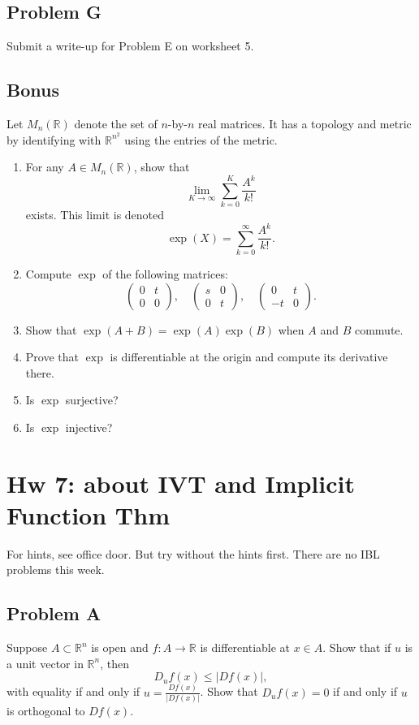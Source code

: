 \documentclass[lang=cn,11pt]{template}
\begin{document}
\section*{Problem G}
Submit a write-up for Problem E on worksheet 5.

\section*{Bonus}
Let $M_n(\mathbb{R})$ denote the set of $n$-by-$n$ real matrices. It has a topology and metric by identifying with $\mathbb{R}^{n^2}$ using the entries of the metric.
\begin{enumerate}
    \item For any $A \in M_n(\mathbb{R})$, show that
    \[
    \lim_{K \to \infty} \sum_{k=0}^K \frac{A^k}{k!}
    \]
    exists. This limit is denoted
    \[
    \exp(X) = \sum_{k=0}^\infty \frac{A^k}{k!}.
    \]
    \item Compute $\exp$ of the following matrices:
    \[
    \begin{pmatrix} 0 & t \\ 0 & 0 \end{pmatrix}, \quad \begin{pmatrix} s & 0 \\ 0 & t \end{pmatrix}, \quad \begin{pmatrix} 0 & t \\ -t & 0 \end{pmatrix}.
    \]
    \item Show that $\exp(A + B) = \exp(A)\exp(B)$ when $A$ and $B$ commute.
    \item Prove that $\exp$ is differentiable at the origin and compute its derivative there.
    \item Is $\exp$ surjective?
    \item Is $\exp$ injective?
\end{enumerate}

\chapter*{Hw 7: about IVT and Implicit Function Thm}

For hints, see office door. But try without the hints first. There are no IBL problems this week.

\section*{Problem A}
Suppose $A \subset \mathbb{R}^n$ is open and $f : A \to \mathbb{R}$ is differentiable at $x \in A$. Show that if $u$ is a unit vector in $\mathbb{R}^n$, then
\[
D_u f(x) \leq |Df(x)|,
\]
with equality if and only if $u = \frac{Df(x)}{|Df(x)|}$. Show that $D_u f(x) = 0$ if and only if $u$ is orthogonal to $Df(x)$.
\end{document}
